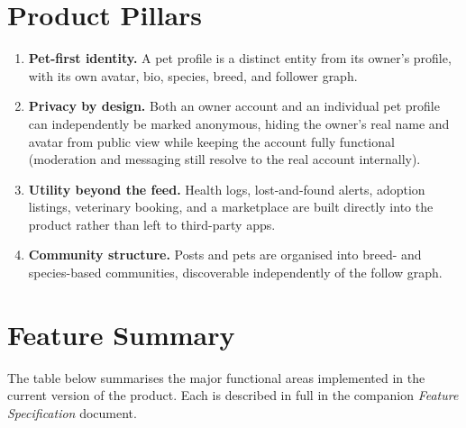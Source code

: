 \documentclass[11pt,a4paper]{article}
\begin{document}
\section{Product Pillars}
\begin{enumerate}[leftmargin=*]
  \item \textbf{Pet-first identity.} A pet profile is a distinct entity from its owner's
        profile, with its own avatar, bio, species, breed, and follower graph.
  \item \textbf{Privacy by design.} Both an owner account and an individual pet profile
        can independently be marked anonymous, hiding the owner's real name and avatar
        from public view while keeping the account fully functional (moderation and
        messaging still resolve to the real account internally).
  \item \textbf{Utility beyond the feed.} Health logs, lost-and-found alerts, adoption
        listings, veterinary booking, and a marketplace are built directly into the
        product rather than left to third-party apps.
  \item \textbf{Community structure.} Posts and pets are organised into breed- and
        species-based communities, discoverable independently of the follow graph.
\end{enumerate}

\section{Feature Summary}
The table below summarises the major functional areas implemented in the current
version of the product. Each is described in full in the companion
\emph{Feature Specification} document.
\end{document}
